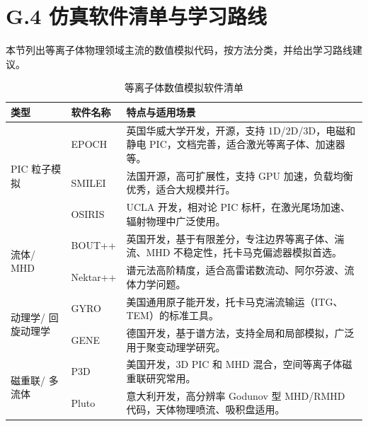 \documentclass[12pt,a4paper,openany,oneside]{book}
\begin{document}
\section{G.4 仿真软件清单与学习路线}

本节列出等离子体物理领域主流的数值模拟代码，按方法分类，并给出学习路线建议。

\begin{table}[htbp]
\centering
\caption{等离子体数值模拟软件清单}
\label{tab:software}
\begin{tabular}{@{}p{2.8cm}p{3.5cm}p{6.5cm}@{}}
\toprule
\textbf{类型} & \textbf{软件名称} & \textbf{特点与适用场景} \\
\midrule
\multirow{3}{2.8cm}{PIC 粒子模拟} & EPOCH & 英国华威大学开发，开源，支持 1D/2D/3D，电磁和静电 PIC，文档完善，适合激光等离子体、加速器等。 \\
 & SMILEI & 法国开源，高可扩展性，支持 GPU 加速，负载均衡优秀，适合大规模并行。 \\
 & OSIRIS & UCLA 开发，相对论 PIC 标杆，在激光尾场加速、辐射物理中广泛使用。 \\
\midrule
\multirow{2}{2.8cm}{流体/ MHD} & BOUT++ & 英国开发，基于有限差分，专注边界等离子体、湍流、MHD 不稳定性，托卡马克偏滤器模拟首选。 \\
 & Nektar++ & 谱元法高阶精度，适合高雷诺数流动、阿尔芬波、流体力学问题。 \\
\midrule
\multirow{2}{2.8cm}{动理学/ 回旋动理学} & GYRO & 美国通用原子能开发，托卡马克湍流输运（ITG、TEM）的标准工具。 \\
 & GENE & 德国开发，基于谱方法，支持全局和局部模拟，广泛用于聚变动理学研究。 \\
\midrule
\multirow{2}{2.8cm}{磁重联/ 多流体} & P3D & 美国开发，3D PIC 和 MHD 混合，空间等离子体磁重联研究常用。 \\
 & Pluto & 意大利开发，高分辨率 Godunov 型 MHD/RMHD 代码，天体物理喷流、吸积盘适用。 \\
\bottomrule
\end{tabular}
\end{table}
\end{document}
